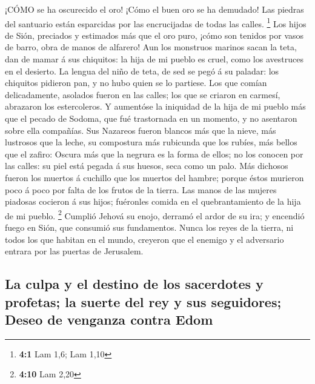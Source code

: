  ¡CÓMO se ha oscurecido el oro! ¡Cómo el buen oro se ha
demudado! Las piedras del santuario están esparcidas por las
encrucijadas de todas las calles. \footnote{\textbf{4:1} Lam 1,6; Lam
  1,10}  Los hijos de Sión, preciados y estimados más que el
oro puro, ¡cómo son tenidos por vasos de barro, obra de manos de
alfarero!  Aun los monstruos marinos sacan la teta, dan de
mamar á sus chiquitos: la hija de mi pueblo es cruel, como los
avestruces en el desierto.  La lengua del niño de teta, de
sed se pegó á su paladar: los chiquitos pidieron pan, y no hubo quien se
lo partiese.  Los que comían delicadamente, asolados fueron
en las calles; los que se criaron en carmesí, abrazaron los
estercoleros.  Y aumentóse la iniquidad de la hija de mi
pueblo más que el pecado de Sodoma, que fué trastornada en un momento, y
no asentaron sobre ella compañías.  Sus Nazareos fueron
blancos más que la nieve, más lustrosos que la leche, su compostura más
rubicunda que los rubíes, más bellos que el zafiro:  Oscura
más que la negrura es la forma de ellos; no los conocen por las calles:
su piel está pegada á sus huesos, seca como un palo.  Más
dichosos fueron los muertos á cuchillo que los muertos del hambre;
porque éstos murieron poco á poco por falta de los frutos de la tierra.
 Las manos de las mujeres piadosas cocieron á sus hijos;
fuéronles comida en el quebrantamiento de la hija de mi pueblo.
\footnote{\textbf{4:10} Lam 2,20}  Cumplió Jehová su enojo,
derramó el ardor de su ira; y encendió fuego en Sión, que consumió sus
fundamentos.  Nunca los reyes de la tierra, ni todos los
que habitan en el mundo, creyeron que el enemigo y el adversario entrara
por las puertas de Jerusalem.

\hypertarget{la-culpa-y-el-destino-de-los-sacerdotes-y-profetas-la-suerte-del-rey-y-sus-seguidores-deseo-de-venganza-contra-edom}{%
\subsection{La culpa y el destino de los sacerdotes y profetas; la
suerte del rey y sus seguidores; Deseo de venganza contra
Edom}\label{la-culpa-y-el-destino-de-los-sacerdotes-y-profetas-la-suerte-del-rey-y-sus-seguidores-deseo-de-venganza-contra-edom}}

